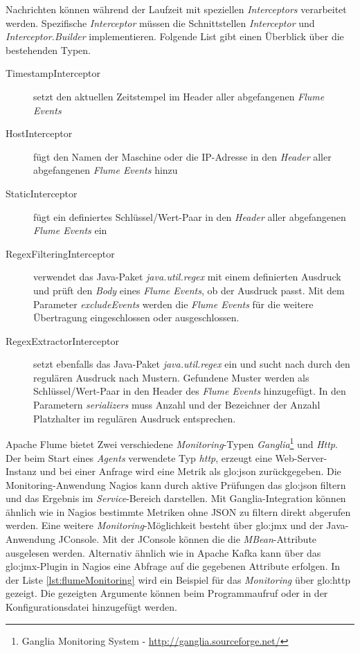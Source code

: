 Nachrichten können während der Laufzeit mit speziellen \textit{Interceptors} verarbeitet werden. Spezifische \textit{Interceptor} müssen die Schnittstellen \textit{Interceptor} und \textit{Interceptor.Builder} implementieren. Folgende List gibt einen Überblick über die bestehenden Typen.
\begin{description}
	\item[TimestampInterceptor] setzt den aktuellen Zeitstempel im Header aller abgefangenen \textit{Flume Events} 
	\item[HostInterceptor] fügt den Namen der Maschine oder die IP-Adresse in den \textit{Header} aller abgefangenen \textit{Flume Events} hinzu 
	\item[StaticInterceptor] fügt ein definiertes Schlüssel/Wert-Paar in den \textit{Header} aller abgefangenen \textit{Flume Events} ein 
	\item[RegexFilteringInterceptor] verwendet das Java-Paket \textit{java.util.regex} mit einem definierten Ausdruck und prüft den \textit{Body} eines \textit{Flume Events}, ob der Ausdruck passt. Mit dem Parameter \textit{excludeEvents} werden die \textit{Flume Events} für die weitere Übertragung eingeschlossen oder ausgeschlossen. 
	\item[RegexExtractorInterceptor] setzt ebenfalls das Java-Paket \textit{java.util.regex} ein und sucht nach durch den regulären Ausdruck nach Mustern. Gefundene Muster werden als Schlüssel/Wert-Paar in den Header des \textit{Flume Events} hinzugefügt. In den Parametern \textit{serializers} muss Anzahl und der Bezeichner der Anzahl Platzhalter im regulären Ausdruck entsprechen. 
\end{description}

Apache Flume bietet Zwei verschiedene \textit{Monitoring}-Typen \textit{Ganglia}\footnote{Ganglia Monitoring System - \url{http://ganglia.sourceforge.net/}} und \textit{Http}. Der beim Start eines \textit{Agents} verwendete Typ \textit{http}, erzeugt eine Web-Server-Instanz und bei einer Anfrage wird eine Metrik als \gls{glo:json} zurückgegeben. Die Monitoring-Anwendung Nagios kann durch aktive Prüfungen das \gls{glo:json} filtern und das Ergebnis im \textit{Service}-Bereich darstellen. Mit Ganglia-Integration können ähnlich wie in Nagios bestimmte Metriken ohne JSON zu filtern direkt abgerufen werden. Eine weitere \textit{Monitoring}-Möglichkeit besteht über \gls{glo:jmx} und der Java-Anwendung JConsole. Mit der JConsole können die die \textit{MBean}-Attribute ausgelesen werden. Alternativ ähnlich wie in Apache Kafka kann über das \gls{glo:jmx}-Plugin in Nagios eine Abfrage auf die gegebenen Attribute erfolgen. In der Liste \ref{lst:flumeMonitoring} wird ein Beispiel für das \textit{Monitoring} über \gls{glo:http} gezeigt. Die gezeigten Argumente können beim Programmaufruf oder in der Konfigurationsdatei hinzugefügt werden. 


